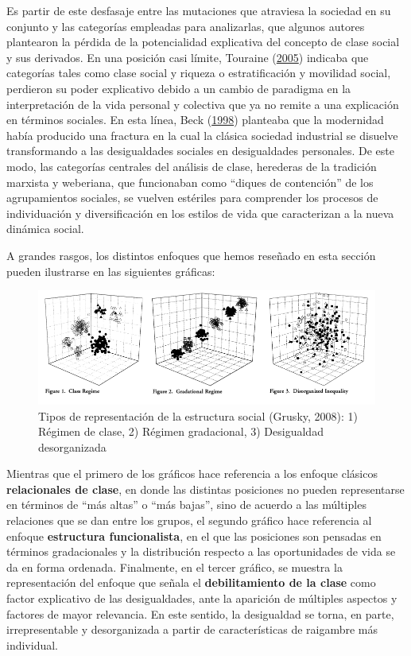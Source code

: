 \documentclass[
]{article}
\begin{document}
Es partir de este desfasaje entre las mutaciones que atraviesa la sociedad en su conjunto y las categorías empleadas para analizarlas, que algunos autores plantearon la pérdida de la potencialidad explicativa del concepto de clase social y sus derivados. En una posición casi límite, Touraine (\protect\hyperlink{ref-Touraine2005}{2005}) indicaba que categorías tales como clase social y riqueza o estratificación y movilidad social, perdieron su poder explicativo debido a un cambio de paradigma en la interpretación de la vida personal y colectiva que ya no remite a una explicación en términos sociales. En esta línea, Beck (\protect\hyperlink{ref-Beck1998}{1998}) planteaba que la modernidad había producido una fractura en la cual la clásica sociedad industrial se disuelve transformando a las desigualdades sociales en desigualdades personales. De este modo, las categorías centrales del análisis de clase, herederas de la tradición marxista y weberiana, que funcionaban como ``diques de contención'' de los agrupamientos sociales, se vuelven estériles para comprender los procesos de individuación y diversificación en los estilos de vida que caracterizan a la nueva dinámica social.

A grandes rasgos, los distintos enfoques que hemos reseñado en esta sección pueden ilustrarse en las siguientes gráficas:

\begin{figure}

{\centering \includegraphics[width=0.8\linewidth]{imagenes/grusky2} 

}

\caption{Tipos de representación de la estructura social (Grusky, 2008): 1) Régimen de clase, 2) Régimen gradacional, 3) Desigualdad desorganizada}\label{fig:xgrusky}
\end{figure}

Mientras que el primero de los gráficos hace referencia a los enfoque clásicos \textbf{relacionales de clase}, en donde las distintas posiciones no pueden representarse en términos de ``más altas'' o ``más bajas'', sino de acuerdo a las múltiples relaciones que se dan entre los grupos, el segundo gráfico hace referencia al enfoque \textbf{estructura funcionalista}, en el que las posiciones son pensadas en términos gradacionales y la distribución respecto a las oportunidades de vida se da en forma ordenada. Finalmente, en el tercer gráfico, se muestra la representación del enfoque que señala el \textbf{debilitamiento de la clase} como factor explicativo de las desigualdades, ante la aparición de múltiples aspectos y factores de mayor relevancia. En este sentido, la desigualdad se torna, en parte, irrepresentable y desorganizada a partir de características de raigambre más individual.
\end{document}
